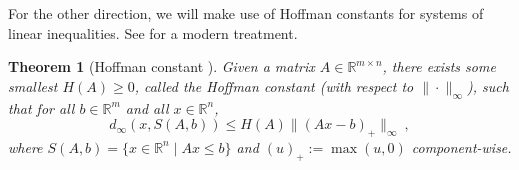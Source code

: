 \documentclass[11pt]{article}
\newcommand{\reals}{\mathbb{R}}
\newtheorem{theorem}{Theorem}
\begin{document}
For the other direction, we will make use of Hoffman constants for systems of linear inequalities.
See \citet{zalinescu2003sharp} for a modern treatment.
\begin{theorem}[Hoffman constant \cite{hoffman1952approximate}]
  \label{thm:hoffman}
  Given a matrix $A\in\reals^{m\times n}$, there exists some smallest $H(A)\geq 0$, called the \emph{Hoffman constant} (with respect to $\|\cdot\|_\infty$), such that for all $b\in\reals^m$ and all $x\in\reals^n$,
  \begin{equation}
    \label{eq:hoffman}
    d_\infty(x,S(A,b)) \leq H(A) \|(A x - b)_+\|_\infty~,
  \end{equation}
  where $S(A,b) = \{x\in\reals^n \mid A x \leq b\}$ and $(u)_+ := \max(u,0)$ component-wise.
\end{theorem}
\end{document}
